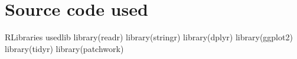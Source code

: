 \chapter{Source code used}

\begin{code}{R}{Libraries used}{lib}
library(readr)
library(stringr)
library(dplyr)
library(ggplot2)
library(tidyr)
library(patchwork)
\end{code}